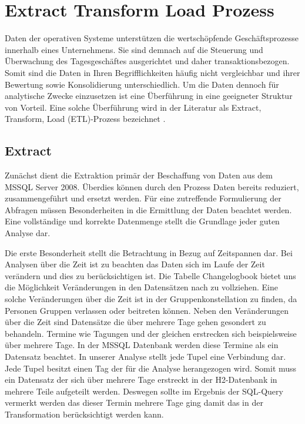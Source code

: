 \section{Extract Transform Load Prozess}

Daten der operativen Systeme unterstützen die wertschöpfende Geschäftsprozesse innerhalb eines Unternehmens. Sie sind demnach auf die Steuerung und Überwachung des Tagesgeschäftes ausgerichtet und daher transaktionsbezogen. Somit sind die Daten in Ihren Begrifflichkeiten häufig nicht vergleichbar und ihrer Bewertung sowie Konsolidierung unterschiedlich. Um die Daten dennoch für analytische Zwecke einzusetzen ist eine Überführung in eine geeigneter Struktur von Vorteil. Eine solche Überführung wird in der Literatur als Extract, Transform, Load (ETL)-Prozess bezeichnet \cite{ElSappagh201191}. 

\subsection{Extract}

Zunächst dient die Extraktion primär der Beschaffung von Daten aus dem MSSQL Server 2008. Überdies können durch den Prozess Daten bereits reduziert,  zusammengeführt und ersetzt werden. Für eine zutreffende Formulierung der Abfragen müssen Besonderheiten in die Ermittlung der Daten beachtet werden. Eine vollständige und korrekte Datenmenge stellt die Grundlage jeder guten Analyse dar.

Die erste Besonderheit stellt die Betrachtung in Bezug auf Zeitspannen dar. Bei Analysen über die Zeit ist zu beachten das Daten sich im Laufe der Zeit verändern und dies zu berücksichtigen ist. Die Tabelle Changelogbook bietet uns die Möglichkeit Veränderungen in den Datensätzen nach zu vollziehen. Eine solche Veränderungen über die Zeit ist in der Gruppenkonstellation zu finden, da Personen Gruppen verlassen oder beitreten können. Neben den Veränderungen über die Zeit sind Datensätze die über mehrere Tage gehen gesondert zu behandeln. Termine wie Tagungen und der gleichen erstrecken sich beispielsweise über mehrere Tage. In der MSSQL Datenbank werden diese Termine als ein Datensatz beachtet. In unserer Analyse stellt jede Tupel eine Verbindung dar. Jede Tupel besitzt einen Tag der für die Analyse herangezogen wird. Somit muss ein Datensatz der sich über mehrere Tage erstreckt in der H2-Datenbank in mehrere Teile aufgeteilt werden. Deswegen sollte im Ergebnis der SQL-Query vermerkt werden das dieser Termin mehrere Tage ging damit das in der Transformation berücksichtigt werden kann. 

